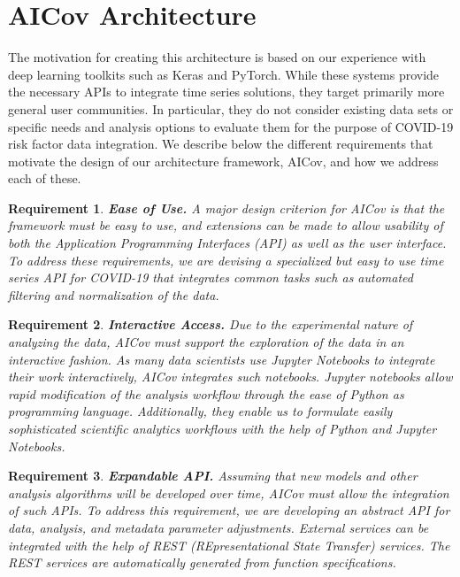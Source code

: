 \documentclass[letterpaper, inpress]{jds} %
\renewcommand{\_}{%
    \textunderscore\hspace{0pt}%
}
\newtheorem{requirement}{Requirement}
\begin{document}
\section{AICov Architecture}
\label{sec:arch}

The motivation for creating this architecture is based on our
experience with deep learning toolkits such as Keras and
PyTorch. While these systems provide the necessary APIs to integrate
time series solutions, they target primarily more general user
communities. In particular, they do not consider existing data sets or
specific needs and analysis options to evaluate them for the purpose
of COVID-19 risk factor data integration. We describe below the
different requirements that motivate the design of our architecture
framework, AICov, and how we address each of these.

\newcommand{\Solution}{}

\begin{requirement}{\bf Ease of Use.}
  A major design criterion for AICov is that the framework must be
  easy to use, and extensions can be made to allow usability of both
  the Application Programming Interfaces (API) as well as the user
  interface. \Solution To address these requirements, we are devising
  a specialized but easy to use time series API for COVID-19 that
  integrates common tasks such as automated filtering and
  normalization of the data.
\end{requirement}


\begin{requirement}{\bf Interactive Access.}
  Due to the experimental nature of analyzing the data, AICov must
  support the exploration of the data in an interactive
  fashion. \Solution As many data scientists use Jupyter Notebooks to
  integrate their work interactively, AICov integrates such
  notebooks. Jupyter notebooks allow rapid modification of the
  analysis workflow through the ease of Python as programming
  language. Additionally, they enable us to formulate easily
  sophisticated scientific analytics workflows with the help of
  Python and Jupyter Notebooks.
\end{requirement}


\begin{requirement}{\bf Expandable API.}
  Assuming that new models and other analysis algorithms will be
  developed over time, AICov must allow the integration of such
  APIs. \Solution To address this requirement, we are developing an
  abstract API for data, analysis, and metadata parameter
  adjustments. External services can be integrated with the help of
  REST (REpresentational State Transfer) services. The REST services
  are automatically generated from function specifications.
\end{requirement}
\end{document}
